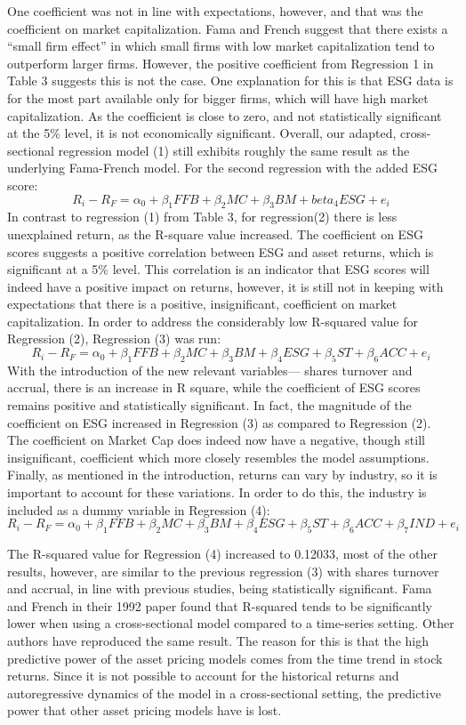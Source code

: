 \documentclass[man,natbib,floatsintext]{apa6}
\begin{document}
One coefficient was not in line with expectations, however, and that was the coefficient on market capitalization. Fama and French suggest that there exists a “small firm effect” in which small firms with low market capitalization tend to outperform larger firms. However, the positive coefficient from Regression 1 in Table 3 suggests this is not the case. One explanation for this is that ESG data is for the most part available only for bigger firms, which will have high market capitalization. As the coefficient is close to zero, and not statistically significant at the 5\% level, it is not economically significant. Overall, our adapted, cross-sectional regression model (1) still exhibits roughly the same result as the underlying Fama-French model. 
For the second regression with the added ESG score:
$$R_i-R_F =\alpha_0+\beta_1 FFB+\beta_2 MC+\beta_3 BM+ beta_4 ESG+e_i$$
In contrast to regression (1) from Table 3, for regression(2) there is less unexplained return, as the R-square value increased. The coefficient on ESG scores suggests a positive correlation between ESG and asset returns, which is significant at a 5\% level. This  correlation is an indicator that ESG scores will indeed have a positive impact on returns, however, it is still not in keeping with expectations that there is a positive, insignificant, coefficient on market capitalization. 
In order to address the considerably low R-squared value for Regression (2), Regression (3) was run: 
$$R_i-R_F =\alpha_0+\beta_1 FFB +\beta_2 MC +\beta_3 BM + \beta_4 ESG +\beta_5 ST + \beta_6 ACC + e_i $$
With the introduction of the new relevant variables--- shares turnover and accrual, there is an increase in R square, while the coefficient of ESG scores remains positive and statistically significant. In fact, the magnitude of the coefficient on ESG increased in Regression (3) as compared to Regression (2). The coefficient on Market Cap does indeed now have a negative, though still insignificant, coefficient which more closely resembles the model assumptions. 
Finally, as mentioned in the introduction, returns can vary by industry, so it is important to account for these variations. In order to do this, the industry is included as a dummy variable in Regression (4):
$$R_i-R_F =\alpha_0+\beta_1 FFB +\beta_2 MC +\beta_3 BM + \beta_4 ESG +\beta_5 ST + \beta_6 ACC +\beta_7 IND +  e_i $$

 The R-squared value for Regression (4) increased to 0.12033, most of the other results, however, are similar to the previous regression (3) with shares turnover and accrual, in line with previous studies, being statistically significant. Fama and French in their 1992 paper \cite{Fama_french_1992} found that R-squared tends to be significantly lower when using a cross-sectional model compared to a time-series setting. Other authors have reproduced the same result. The reason for this is that the high predictive power of the asset pricing models comes from the time trend in stock returns. Since it is not possible to account for the historical returns and autoregressive dynamics of the model in a cross-sectional setting, the predictive power that other asset pricing models have is lost.
\end{document}
